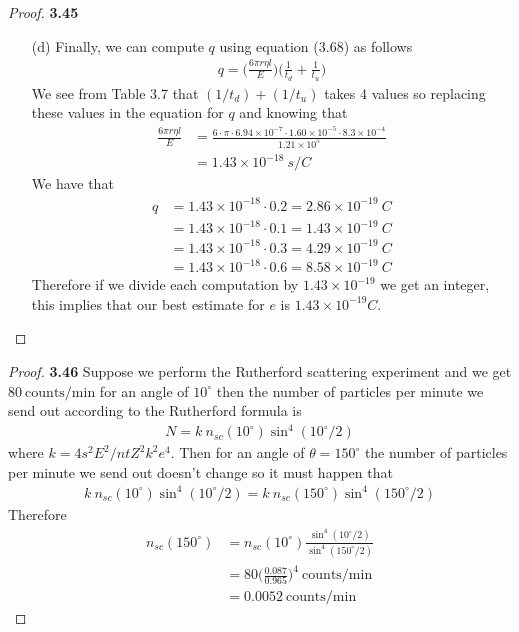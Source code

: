 \documentclass[11pt]{article}
\theoremstyle{definition}
\begin{document}
\begin{proof}{\textbf{3.45}}
\begin{itemize}
    \item [(d)] Finally, we can compute $q$ using equation (3.68) as follows
    \begin{align*}
        q = \bigg(\frac{6\pi r\eta l}{E}\bigg)
        \bigg(\frac{1}{t_d} + \frac{1}{t_u}\bigg)
    \end{align*}
    We see from Table 3.7 that $(1/t_d) + (1/t_u)$ takes 4 values so replacing
    these values in the equation for $q$ and knowing that
    \begin{align*}
        \frac{6\pi r\eta l}{E}
        &= \frac{6 \cdot \pi \cdot 6.94\times 10^{-7} \cdot
        1.60\times 10^{-5} \cdot 8.3 \times 10^{-4}}{1.21 \times 10^{5}}\\
        &= 1.43 \times 10^{-18}~s/C
    \end{align*}
    We have that
    \begin{align*}
        q &= 1.43 \times 10^{-18} \cdot 0.2 = 2.86 \times 10^{-19}~C\\
        &= 1.43 \times 10^{-18} \cdot 0.1 = 1.43 \times 10^{-19}~C\\
        &= 1.43 \times 10^{-18} \cdot 0.3 = 4.29 \times 10^{-19}~C\\
        &= 1.43 \times 10^{-18} \cdot 0.6 = 8.58 \times 10^{-19}~C
    \end{align*}
    Therefore if we divide each computation by $1.43\times 10^{-19}$ we get
    an integer, this implies that our best estimate for $e$ is
    $1.43 \times 10^{-19} C$.
\end{itemize}
\end{proof}
\cleardoublepage
\begin{proof}{\textbf{3.46}}
    Suppose we perform the Rutherford scattering experiment and we get
    $80~\text{counts}/\text{min}$ for an angle of $10^\circ$ then the 
    number of particles per minute we send out according to the Rutherford
    formula is
    \begin{align*}
        N =  k~n_{sc}(10^\circ) \sin^4(10^\circ/2)
    \end{align*}
    where $k = 4s^2 E^2/ntZ^2k^2e^4$. Then for an angle of $\theta = 150^\circ$
    the number of particles per minute we send out doesn't change so 
    it must happen that
    \begin{align*}
        k~n_{sc}(10^\circ) \sin^4(10^\circ/2)
        = k~n_{sc}(150^\circ) \sin^4(150^\circ/2)
    \end{align*}
    Therefore 
    \begin{align*}
        n_{sc}(150^\circ) &= n_{sc}(10^\circ) 
        \frac{\sin^4(10^\circ/2)}{\sin^4(150^\circ/2)}\\
        &= 80 \bigg(\frac{0.087}{0.965}\bigg)^4
        ~\text{counts}/\text{min}\\
        &= 0.0052 ~\text{counts}/\text{min}
    \end{align*}
\end{proof}
\end{document}

